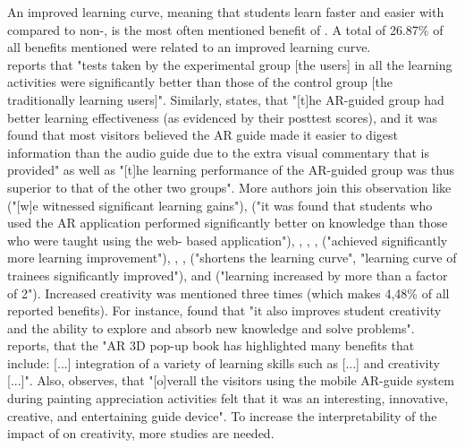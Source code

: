 An improved learning curve, meaning that students learn faster and easier with \AR \apps compared to non-\AR \appsns, is the most often mentioned benefit of \ARns. A total of 26.87\% of all benefits mentioned were related to an improved learning curve. \\
\cite{Liu.2009} reports that "tests taken by the experimental group [the \AR \app users] in all the learning activities were significantly better than those of the control group [the traditionally learning users]".\autocite[525]{Liu.2009} Similarly, \cite{Chang.2014} states, that "[t]he AR-guided group had better learning effectiveness (as evidenced by their posttest scores), and it was found that most visitors believed the AR guide made it easier to digest information than the audio guide due to the extra visual commentary that is provided"\autocite[193]{Chang.2014} as well as "[t]he learning performance of the AR-guided group was thus superior to
that of the other two groups"\autocite[190]{Chang.2014}. More authors join this observation like \cite{Kamarainen.2013} ("[w]e witnessed significant learning gains"\autocite[550]{Kamarainen.2013}), \cite{Ibanez.2014} ("it was found that students who used the AR application performed significantly better on knowledge than those who were taught using the web- based application"\autocite[12]{Ibanez.2014}), \cite{Li.2011}, \cite{MartinGutierrez.2011}, \cite{Redondo.2013}, \cite{Liu.2009b} ("achieved significantly more learning improvement"\autocite[173]{Liu.2009b}), \cite{Zhang.2014}, \cite{Yeo.2011}, \cite{Hou.2013} ("shortens the learning curve"\autocite[450]{Hou.2013}, "learning curve of trainees significantly improved"\autocite[451]{Hou.2013}), \cite{Wilson.2013} and \cite{Anderson.2013} ("learning increased by more than a factor of 2"\autocite[318]{Anderson.2013}). 
Increased creativity was mentioned three times (which makes 4,48\% of all reported benefits). For instance, \cite{Liu.2009b} found that "it also improves student creativity and the ability to explore and absorb new knowledge and solve problems"\autocite[173]{Liu.2009b}. \cite{VateULan.2012} reports, that the "AR 3D pop-up book has highlighted many benefits that include: [...] integration of a variety of learning skills such as [...] and creativity [...]"\autocite[894]{VateULan.2012}. Also, \cite{Chang.2014} observes, that "[o]verall the visitors using the mobile AR-guide system during painting appreciation activities felt that it was an interesting, innovative, creative, and entertaining guide device"\autocite[194]{Chang.2014}. To increase the interpretability of the impact of \AR \apps on creativity, more studies are needed.
% 

